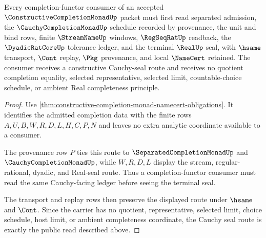 \begin{theorem}
\label{thm:constructive-completion-monad-cauchy-seal-route}
Every completion-functor consumer of an accepted $\ConstructiveCompletionMonadUp$ packet must first read separated admission, the $\CauchyCompletionMonadUp$ schedule recorded by provenance, the unit and bind rows, finite $\StreamNameUp$ windows, $\RegSeqRatUp$ readback, the $\DyadicRatCoreUp$ tolerance ledger, and the terminal $\RealUp$ seal, with $\hsame$ transport, $\Cont$ replay, $\Pkg$ provenance, and local $\NameCert$ retained. The consumer receives a constructive Cauchy-seal route and receives no quotient completion equality, selected representative, selected limit, countable-choice schedule, or ambient Real completeness principle.
\end{theorem}
\begin{proof}
Use \autoref{thm:constructive-completion-monad-namecert-obligations}. It identifies the admitted completion data with the finite rows $A,U,B,W,R,D,L,H,C,P,N$ and leaves no extra analytic coordinate available to a consumer.

The provenance row $P$ ties this route to $\SeparatedCompletionMonadUp$ and $\CauchyCompletionMonadUp$, while $W,R,D,L$ display the stream, regular-rational, dyadic, and Real-seal route. Thus a completion-functor consumer must read the same Cauchy-facing ledger before seeing the terminal seal.

The transport and replay rows then preserve the displayed route under $\hsame$ and $\Cont$. Since the carrier has no quotient, representative, selected limit, choice schedule, host limit, or ambient completeness coordinate, the Cauchy seal route is exactly the public read described above.
\end{proof}



